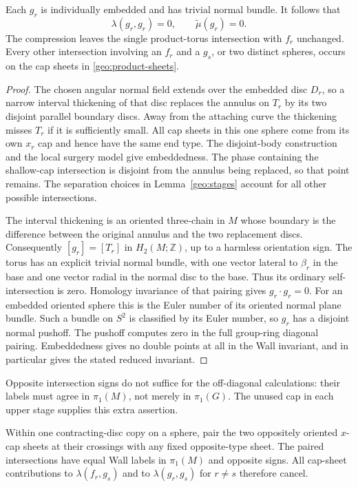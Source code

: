 \begin{lemma}\label{geo:dual-candidates}
Each $g_r$ is individually embedded and has trivial normal bundle.
It follows that
\[
 \lambda(g_r,g_r)=0,\qquad \widetilde\mu(g_r)=0.
\]
The compression leaves the single product-torus intersection
with $f_r$ unchanged.  Every other intersection involving an
$f_r$ and a $g_s$, or two distinct spheres, occurs on the cap
sheets in \eqref{geo:product-sheets}.
\end{lemma}

\begin{proof}
The chosen angular normal field extends over the embedded disc
$D_r$, so a narrow interval thickening of that disc replaces the
annulus on $T_r$ by its two disjoint parallel boundary discs.
Away from the attaching curve the thickening misses $T_r$ if
it is sufficiently small.  All cap sheets in this one sphere
come from its own $x_r$ cap and hence have the same end type.
The disjoint-body construction and the local surgery model give
embeddedness.  The phase containing the shallow-cap intersection
is disjoint from the annulus being replaced, so that point remains.
The separation choices in Lemma~\ref{geo:stages} account for all
other possible intersections.

The interval thickening is an oriented three-chain in $M$ whose
boundary is the difference between the original annulus and the
two replacement discs.  Consequently $[g_r]=[T_r]$ in
$H_2(M;\mathbb Z)$, up to a harmless orientation sign.  The torus
has an explicit trivial normal bundle, with one vector lateral
to $\beta_r$ in the base and one vector radial in the normal
disc to the base.  Thus its ordinary self-intersection is zero.
Homology invariance of that pairing gives $g_r\cdot g_r=0$.
For an embedded oriented sphere this is the Euler number of its
oriented normal plane bundle.  Such a bundle on $S^2$ is classified
by its Euler number, so $g_r$ has a disjoint normal pushoff.
The pushoff computes zero in the full group-ring diagonal pairing.
Embeddedness gives no double points at all in the Wall invariant,
and in particular gives the stated reduced invariant.
\end{proof}

Opposite intersection signs do not suffice for the off-diagonal
calculations: their labels must agree in $\pi_1(M)$, not merely
in $\pi_1(G)$.  The unused cap in each upper stage supplies this
extra assertion.

\begin{lemma}\label{geo:labels}
Within one contracting-disc copy on a sphere, pair the two
oppositely oriented $x$-cap sheets at their crossings with any
fixed opposite-type sheet.  The paired intersections have equal
Wall labels in $\pi_1(M)$ and opposite signs.  All cap-sheet
contributions to $\lambda(f_r,g_s)$ and to
$\lambda(g_r,g_s)$ for $r\ne s$ therefore cancel.
\end{lemma}

